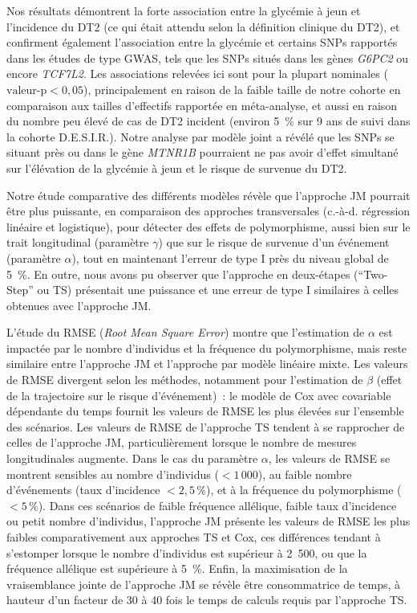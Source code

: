 \documentclass[11pt,a4paper,notrimn]{krantz}
\theoremstyle{definition}
\theoremstyle{definition}
\theoremstyle{remark}
\begin{document}
Nos résultats démontrent la forte association entre la glycémie à jeun
et l'incidence du DT2 (ce qui était attendu selon la définition clinique
du DT2), et confirment également l'association entre la glycémie et
certains SNPs rapportés dans les études de type GWAS, tels que les SNPs
situés dans les gènes \emph{G6PC2} ou encore \emph{TCF7L2}. Les
associations relevées ici sont pour la plupart nominales
(\(\textrm{valeur-p} < 0,05\)), principalement en raison de la faible
taille de notre cohorte en comparaison aux tailles d'effectifs rapportée
en méta-analyse, et aussi en raison du nombre peu élevé de cas de DT2
incident (environ 5~\% sur 9 ans de suivi dans la cohorte D.E.S.I.R.).
Notre analyse par modèle joint a révélé que les SNPs se situant près ou
dans le gène \emph{MTNR1B} pourraient ne pas avoir d'effet simultané sur
l'élévation de la glycémie à jeun et le risque de survenue du DT2.

Notre étude comparative des différents modèles révèle que l'approche JM
pourrait être plus puissante, en comparaison des approches transversales
(c.-à-d. régression linéaire et logistique), pour détecter des effets de
polymorphisme, aussi bien sur le trait longitudinal (paramètre
\(\gamma\)) que sur le risque de survenue d'un événement (paramètre
\(\alpha\)), tout en maintenant l'erreur de type I près du niveau global
de 5~\%. En outre, nous avons pu observer que l'approche en deux-étapes
(``Two-Step'' ou TS) présentait une puissance et une erreur de type I
similaires à celles obtenues avec l'approche JM.

L'étude du RMSE (\emph{Root Mean Square Error}) montre que l'estimation
de \(\alpha\) est impactée par le nombre d'individus et la fréquence du
polymorphisme, mais reste similaire entre l'approche JM et l'approche
par modèle linéaire mixte. Les valeurs de RMSE divergent selon les
méthodes, notamment pour l'estimation de \(\beta\) (effet de la
trajectoire sur le risque d'événement)~: le modèle de Cox avec
covariable dépendante du temps fournit les valeurs de RMSE les plus
élevées sur l'ensemble des scénarios. Les valeurs de RMSE de l'approche
TS tendent à se rapprocher de celles de l'approche JM, particulièrement
lorsque le nombre de mesures longitudinales augmente. Dans le cas du
paramètre \(\alpha\), les valeurs de RMSE se montrent sensibles au
nombre d'individus (\(<1\,000\)), au faible nombre d'événements (taux
d'incidence \(<2,5\,\%\)), et à la fréquence du polymorphisme
(\(<5\,\%\)). Dans ces scénarios de faible fréquence allélique, faible
taux d'incidence ou petit nombre d'individus, l'approche JM présente les
valeurs de RMSE les plus faibles comparativement aux approches TS et
Cox, ces différences tendant à s'estomper lorsque le nombre d'individus
est supérieur à 2~500, ou que la fréquence allélique est supérieure à
5~\%. Enfin, la maximisation de la vraisemblance jointe de l'approche JM
se révèle être consommatrice de temps, à hauteur d'un facteur de 30 à 40
fois le temps de calculs requis par l'approche TS.
\end{document}
